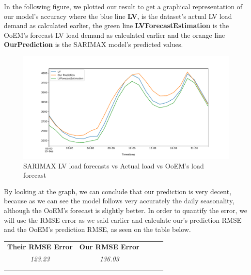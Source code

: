 In the following figure, we plotted our result to get a graphical representation of our model's accuracy where the blue line \textbf{LV}, is the dataset's actual LV load demand as calculated earlier, the green line \textbf{LVForecastEstimation} is the OoEM's forecast LV load demand as calculated earlier and the orange line \textbf{OurPrediction} is the SARIMAX model's predicted values.
\begin{figure}[ht!]
\centering
\includegraphics[width=1\linewidth]{project/sarimax.pdf}
\caption{SARIMAX LV load forecasts vs Actual load vs OoEM's load forecast}
\end{figure}
\par By looking at the graph, we can conclude that our prediction is very decent, because as we can see the model follows very accurately the daily seasonality, although the OoEM's forecast is slightly better. In order to quantify the error, we will use the RMSE error as we said earlier and calculate our's prediction RMSE and the OoEM's prediction RMSE, as seen on the table below.
\begin{table}[ht!]
\centering
\begin{tabular}{lllll}
\cline{1-2}
\multicolumn{1}{|l|}{\textbf{Their RMSE Error}} & \multicolumn{1}{l|}{\textbf{Our RMSE Error}} &  &  &  \\ \cline{1-2}
\multicolumn{1}{|c|}{\textit{123.23}} & \multicolumn{1}{c|}{\textit{136.03}} &  &  &  \\ \cline{1-2}
                                &                                &  &  &  \\
                                &                                &  &  & 
\end{tabular}
\end{table}
\newpage 
